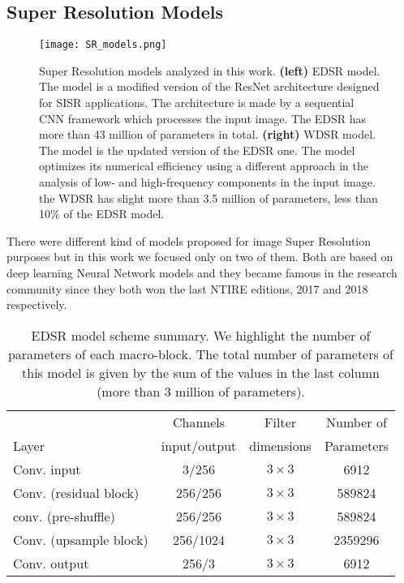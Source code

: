 \documentclass{standalone}
\begin{document}
\subsection[Super Resolution Models]{Super Resolution Models}\label{SR:wdsr}

\begin{center}
\begin{figure}[htbp]
\centering
\texttt{[image: SR\_models.png]}
\caption{Super Resolution models analyzed in this work.
\textbf{(left)} EDSR model.
The model is a modified version of the ResNet architecture designed for SISR applications.
The architecture is made by a sequential CNN framework which processes the input image.
The EDSR has more than 43 million of parameters in total.
\textbf{(right)} WDSR model.
The model is the updated version of the EDSR one.
The model optimizes its numerical efficiency using a different approach in the analysis of low- and high-frequency components in the input image.
the WDSR has slight more than 3.5 million of parameters, less than 10\% of the EDSR model.
}
\label{fig:sr_models}
\end{figure}
\end{center}

There were different kind of models proposed for image Super Resolution purposes but in this work we focused only on two of them.
Both are based on deep learning Neural Network models and they became famous in the research community since they both won the last NTIRE editions, 2017 and 2018 respectively.

\begin{table}[htbp]
\centering
\begin{tabular}{lccc}
\hline \rowcolor{darkgrayrow}
                         &  Channels     & Filter     & Number of    \\
\rowcolor{darkgrayrow}
Layer                    & input/output  & dimensions & Parameters   \\
\hline
Conv. input              & 3/256      & $3\times3$   & 6912    \\
Conv. (residual block)   & 256/256    & $3\times3$   & 589824  \\
conv. (pre-shuffle)      & 256/256    & $3\times3$   & 589824  \\
Conv. (upsample block)   & 256/1024   & $3\times3$   & 2359296 \\
Conv. output             & 256/3      & $3\times3$   & 6912    \\
\hline
\end{tabular}
\caption{EDSR model scheme summary.
We highlight the number of parameters of each macro-block.
The total number of parameters of this model is given by the sum of the values in the last column (more than 3 million of parameters).
}
\label{tab:edsr}
\end{table}
\end{document}
